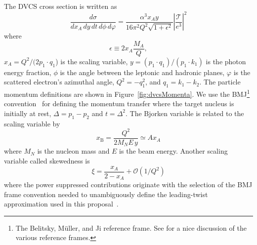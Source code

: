 The DVCS cross section is written as
\begin{equation}
\frac{d\sigma}{dx_A\,dy\,dt\,d\phi\,d\varphi} = \frac{\alpha^3 x_A y}{16 \pi^2 
Q^2 \sqrt{1+\epsilon^2}} \left| \frac{\mathcal{T}}{e^3} \right|^2
\end{equation}
where
\begin{equation}
   \epsilon \equiv 2x_A \frac{M_A}{Q},
\end{equation}
$x_A=Q^2/(2p_1\cdot q_1$) is the scaling variable, $y= (p_1\cdot q_1)/(p_1\cdot 
k_1)$ is the photon energy fraction, $\phi$ is the angle between the leptonic 
and hadronic planes, $\varphi$ is the scattered electron's azimuthal angle, $Q^2= 
-q_1^2$, and $q_1=k_1-k_2$. The particle momentum definitions are shown in 
Figure~\ref{fig:dvcsMomenta}. We use the BMJ\footnote{The Belitsky, M\"{u}ller, and
Ji reference frame. See \cite{Braun:2014paa} for a nice discussion of the 
various reference frames.} 
convention~\cite{Braun:2014paa,Belitsky:2001ns,Belitsky:2010jw,Belitsky:2012ch} 
for defining the momentum transfer where the target nucleus is initially at 
rest, $\Delta = p_1-p_2$ and $t=\Delta^2$. The Bjorken variable  is related to 
the scaling variable by
%
\begin{equation}
   x_{\text{B}} = \frac{Q^2}{2 M_N E\,y} \simeq A x_A
\end{equation}
%
where $M_N$ is the nucleon mass and $E$ is the beam energy. Another scaling variable called skewedness is
%
\begin{equation}
\xi = \frac{x_A}{2 - x_A} + \mathcal{O}(1/Q^2)
\end{equation}
where the power suppressed contributions originate with the selection of the 
BMJ frame convention needed to unambiguously define the leading-twist 
approximation used in this proposal~\cite{Braun:2014paa}.

